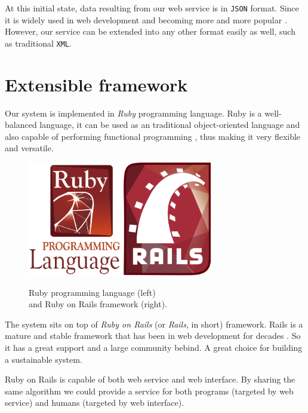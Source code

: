 At this initial state, data resulting from our web service
is in \texttt{JSON} \cite{json} format. Since it is widely used in web development
and becoming more and more popular \cite{rest}. However, our service can be extended
into any other format easily as well, such as traditional \texttt{XML}.

\section{Extensible framework}


Our system is implemented in \emph{Ruby} \cite{ruby} programming language.
Ruby is a well-balanced language, it can be used as an traditional
object-oriented language \cite{rubyoo} and also capable of performing
functional programming \cite[]{rubyfp}, thus making it very flexible and versatile.

\begin{figure}
\centering
\captionsetup{justification=centering}
\includegraphics[height=5cm]{gfx/ruby}
\hspace{0.5cm}
\includegraphics[height=5cm]{gfx/ror}
\caption[Ruby and Ruby on Rails]{Ruby programming language (left) \\
and Ruby on Rails framework (right).}
\end{figure}


The system sits on top of \emph{Ruby on Rails}
(or \emph{Rails}, in short) \cite{rails} framework.
Rails is a mature and stable framework that has been in
web development for decades \cite[]{railsd}. So it has a great support
and a large community bebind. A great choice for building a sustainable
system.

Ruby on Rails is capable of both web service and web interface.
By sharing the same algorithm we could provide a service
for both programs (targeted by web service) and humans
(targeted by web interface).
